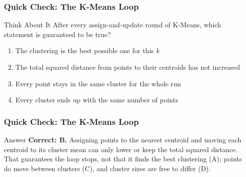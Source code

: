 \begin{frame}[fragile]\frametitle{Quick Check: The K-Means Loop}
\begin{block}{Think About It}
After every assign-and-update round of K-Means, which statement is guaranteed to be true?
\begin{enumerate}
  \item[A.] The clustering is the best possible one for this $k$
  \item[B.] The total squared distance from points to their centroids has not increased
  \item[C.] Every point stays in the same cluster for the whole run
  \item[D.] Every cluster ends up with the same number of points
\end{enumerate}
\end{block}
\end{frame}

\begin{frame}[fragile]\frametitle{Quick Check: The K-Means Loop}
\begin{block}{Answer}
\textbf{Correct: B.} Assigning points to the nearest centroid and moving each centroid to its cluster mean can only lower or keep the total squared distance. That guarantees the loop stops, not that it finds the best clustering (A); points do move between clusters (C), and cluster sizes are free to differ (D).
\end{block}
\end{frame}

